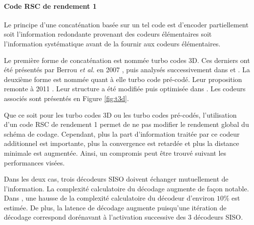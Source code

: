 \paragraph{Code RSC de rendement 1}
Le principe d'une concaténation basée sur un tel code est d'encoder partiellement soit l'information redondante 
provenant des codeurs élémentaires soit l'information systématique avant de la fournir aux codeurs élémentaires.

Le première forme de concaténation est nommée turbo codes 3D. Ces derniers ont été présentés par Berrou \textit{et al.} 
en 2007 \cite{TC3D_1}, puis analysés successivement dans \cite{TC3D_2} et \cite{TC3D_3}.
La deuxième forme est nommée quant à elle turbo code pré-codé. Leur proposition remonte à 2011 \cite{precoded}. Leur structure a 
été modifiée puis optimisée dans \cite{precoding}. Les codeurs associés sont présentés en Figure \ref{fig:t3d}.

Que ce soit pour les turbo codes 3D ou les turbo codes pré-codés, l'utilisation d'un code RSC de rendement 1 permet de 
ne pas modifier le rendement global du schéma de codage. Cependant, plus la part d'information traitée par ce codeur 
additionnel est importante, plus la convergence est retardée et plus la distance minimale est augmentée. Ainsi, un 
compromis peut être trouvé suivant les performances visées. 

Dans les deux cas, trois décodeurs SISO doivent échanger mutuellement de l'information. La complexité calculatoire du 
décodage augmente de façon notable. Dans \cite{TC3D_2}, une hausse de la complexité calculatoire du décodeur  d'environ 
$10\%$ est estimée. De plus, la latence de décodage augmente puisqu'une itération de décodage correspond dorénavant à 
l'activation successive des 3 décodeurs SISO.

